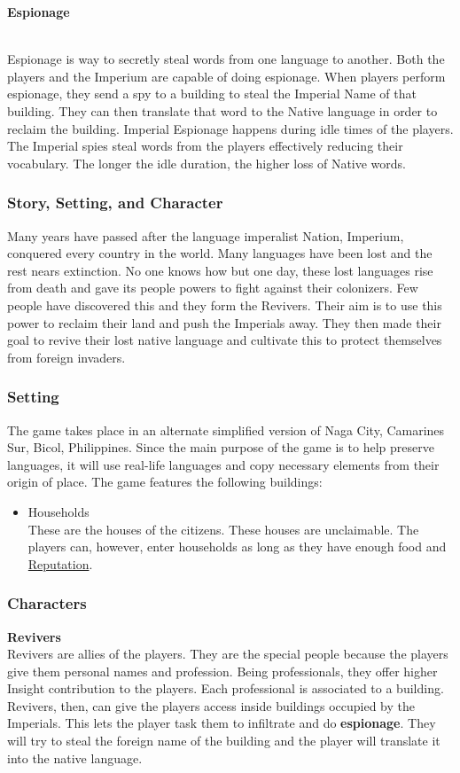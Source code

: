 \documentclass[11pt]{article}
\begin{document}
\hypertarget{espionage}{\textbf{Espionage}}\\
Espionage is way to secretly steal words from one language to another. Both the players and the Imperium are capable of doing espionage. When players perform espionage, they send a spy to a building to steal the Imperial Name of that building. They can then translate that word to the Native language in order to reclaim the building. Imperial Espionage happens during idle times of the players. The Imperial spies steal words from the players effectively reducing their vocabulary. The longer the idle duration, the higher loss of Native words.\\

\subsubsection{Story, Setting, and Character}
Many years have passed after the language imperalist Nation, Imperium, conquered every country in the world. Many languages have been lost and the rest nears extinction. No one knows how but one day, these lost languages rise from death and gave its people powers to fight against their colonizers. Few people have discovered this and they form the Revivers. Their aim is to use this power to reclaim their land and push the Imperials away. They then made their goal to revive their lost native language and cultivate this to protect themselves from foreign invaders. 

\subsubsection{Setting}
The game takes place in an alternate simplified version of Naga City, Camarines Sur, Bicol, Philippines. Since the main purpose of the game is to help preserve languages, it will use real-life languages and copy necessary elements from their origin of place. The game features the following buildings:
\begin{itemize}
\item
  Households\\
  These are the houses of the citizens. These houses are unclaimable. The players can, however, enter households as long as they have enough food and \hyperlink{reputation}{Reputation}.
\end{itemize}

\subsubsection{Characters}
\textbf{Revivers}\\
Revivers are allies of the players. They are the special people because the players give them personal names and profession. Being professionals, they offer higher Insight contribution to the players. Each professional is associated to a building. Revivers, then, can give the players access inside buildings occupied by the Imperials. This lets the player task them to infiltrate and do \textbf{espionage}. They will try to steal the foreign name of the building and the player will translate it into the native language.
\end{document}
